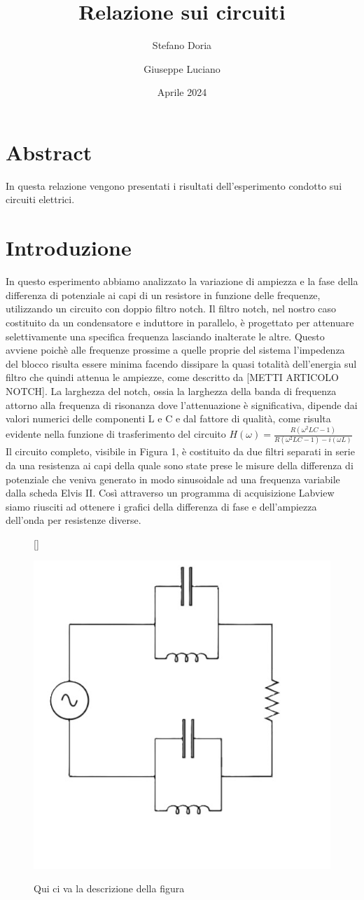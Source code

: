 \documentclass[12pt, letterpaper]{article}
\begin{document}
\title{\textbf{Relazione sui circuiti}}
\author{Stefano Doria \and Giuseppe Luciano}
\date{Aprile 2024}

\maketitle

\section{Abstract}
In questa relazione vengono presentati i risultati dell'esperimento condotto sui circuiti elettrici.

\section{Introduzione}

In questo esperimento abbiamo analizzato la variazione di ampiezza e la fase della differenza di potenziale ai capi di un resistore in funzione delle frequenze, utilizzando un circuito con doppio filtro notch. Il filtro notch, nel nostro caso costituito da un condensatore e induttore in parallelo, è progettato per attenuare selettivamente una specifica frequenza lasciando inalterate le altre. Questo avviene poichè alle frequenze prossime a quelle proprie del sistema l'impedenza del blocco risulta essere minima facendo dissipare la quasi totalità dell’energia sul filtro che quindi attenua le ampiezze, come descritto da [METTI ARTICOLO NOTCH]. La larghezza del notch, ossia la larghezza della banda di frequenza attorno alla frequenza di risonanza dove l'attenuazione è significativa, dipende dai valori numerici delle componenti L e C e dal fattore di qualità, come risulta evidente nella funzione di trasferimento del circuito  $H(\omega) = \frac{R(\omega^2 LC-1)}{R(\omega^2 LC -1) -i(\omega L)}$
Il circuito completo, visibile in Figura 1, è costituito da due filtri separati in serie da una resistenza ai capi della quale sono state prese le misure della differenza di potenziale che veniva generato in modo sinusoidale ad una frequenza variabile dalla scheda Elvis II. Così attraverso un programma di acquisizione Labview siamo riusciti ad ottenere i grafici della differenza di fase e dell’ampiezza dell’onda per resistenze diverse. 
\begin{figure}[h]
[\FBwidth]
{\caption{Qui ci va la descrizione della figura}\label{fig:figura}}
{\includegraphics[width=0.3\linewidth]{circuito.jpeg}}
\end{figure}
\end{document}
